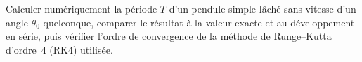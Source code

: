 
\tabresume
{}\of\tabresume \edef\OrdreObserve{\pgfplotsretval}
\of\tabresume \edef\ErreurMin{\pgfplotsretval}
\of\tabresume \edef\ErreurMaxPas{\pgfplotsretval}
\tabperiode
{}\of\tabperiode \edef\TQuatreVingtDix{\pgfplotsretval}
\of\tabperiode \edef\TCentSoixanteDix{\pgfplotsretval}
\of\tabperiode \edef\SerieCentSoixanteDix{\pgfplotsretval}

\begin{objectif}
Calculer numériquement la période $T$ d'un pendule simple lâché sans vitesse
d'un angle $\theta_{0}$ quelconque, comparer le résultat à la valeur exacte et
au développement en série, puis vérifier l'ordre de convergence de la méthode de
Runge–Kutta d'ordre~4 (RK4) utilisée.
\end{objectif}

